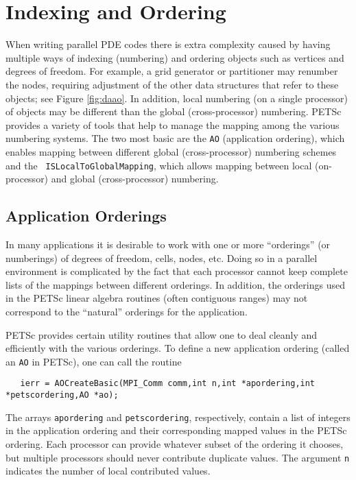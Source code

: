 \section{Indexing and Ordering}
\label{sec:indexingandordering}

  When writing parallel PDE codes there is extra complexity caused by
having multiple ways of indexing (numbering) and ordering objects such
as vertices and degrees of freedom. For example, a grid generator
or partitioner may renumber the nodes, requiring adjustment of the
other data structures that refer to these objects; see Figure
\ref{fig:daao}.  In addition, local numbering (on a single processor) 
of objects may be different than the global (cross-processor)
numbering. PETSc provides a variety of tools that help to manage the
mapping among the various numbering systems. The two most basic are
the {\tt AO} (application ordering), which enables mapping between
different global (cross-processor) numbering schemes and the {\tt
ISLocalToGlobalMapping}, which allows mapping between local 
(on-processor) and global (cross-processor) numbering.

\subsection{Application Orderings}
\label{sec:ao}
 

In many applications it is desirable to work with one or more
``orderings'' (or numberings) of degrees of freedom, cells, nodes,
etc.   Doing so in a parallel environment is
complicated by the fact that each processor cannot keep complete lists
of the mappings between different orderings. In addition, the
orderings used in the PETSc linear algebra routines (often contiguous 
ranges) may not correspond to the ``natural'' orderings for the application.

PETSc provides certain utility routines that allow one to deal cleanly
and efficiently with the various orderings. To define a new application ordering
(called an {\tt AO} in PETSc), one can call the routine 
\begin{verbatim}
   ierr = AOCreateBasic(MPI_Comm comm,int n,int *apordering,int *petscordering,AO *ao);
\end{verbatim}
The  
arrays {\tt apordering} and {\tt petscordering}, respectively, contain a list of integers
in the application ordering and their corresponding mapped values in the PETSc 
ordering. Each processor can provide whatever subset of the ordering it 
chooses, but multiple processors should never contribute duplicate values. 
The argument {\tt n} indicates the number of local contributed values.

